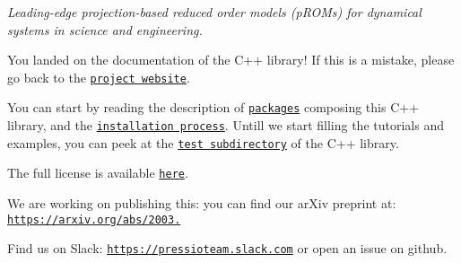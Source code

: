 {\itshape Leading-\/edge projection-\/based reduced order models (p\+R\+O\+Ms) for dynamical systems in science and engineering.}

You landed on the documentation of the C++ library! If this is a mistake, please go back to the \href{https://pressio.github.io/}{\tt project website}.

You can start by reading the description of \href{./md_pages_getstarted_packages.html}{\tt packages} composing this C++ library, and the \href{./md_pages_getstarted_build_and_install.html}{\tt installation process}. Untill we start filling the tutorials and examples, you can peek at the \href{https://github.com/Pressio/pressio/tree/master/tests/rom/burgers1d}{\tt test subdirectory} of the C++ library.

The full license is available \href{https://pressio.github.io/various/license/}{\tt here}.

We are working on publishing this\+: you can find our ar\+Xiv preprint at\+: \href{https://arxiv.org/abs/2003.07798}{\tt https\+://arxiv.\+org/abs/2003.}

Find us on Slack\+: \href{https://pressioteam.slack.com}{\tt https\+://pressioteam.\+slack.\+com} or open an issue on github. 